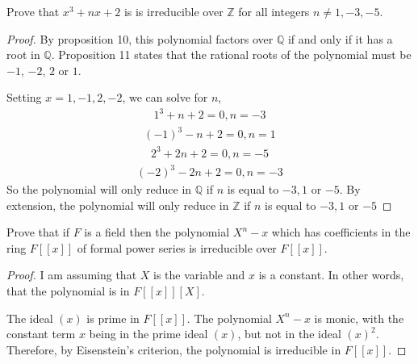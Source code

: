 \documentclass[10pt]{article}
\newenvironment{problem}[2][Problem]{\begin{trivlist}
		\item[\hskip \labelsep {\bfseries #1}\hskip \labelsep {\bfseries #2.}]}{\end{trivlist}}
\begin{document}
	\begin{problem}{4.13}
		Prove that $x^3+nx+2$ is is irreducible over $\mathbb{Z}$ for all integers $n \not = 1,-3,-5$.
		\begin{proof}
			By proposition 10, this polynomial factors over $\mathbb{Q}$ if and only if it has a root in $\mathbb{Q}$. Proposition 11 states that the rational roots of the polynomial must be $-1$, $-2$, $2$ or $1$.
			
			Setting $x=1,-1,2,-2$, we can solve for $n$, 
			\begin{align*}
				1^3 + n + 2 = 0, n = -3
			\end{align*}
			\begin{align*}
				(-1)^3 - n + 2 = 0, n = 1
			\end{align*}
			\begin{align*}
				2^3 + 2n + 2 = 0, n = -5
			\end{align*}
			\begin{align*}
				(-2)^3 - 2n + 2 = 0, n = -3
			\end{align*}
			So the polynomial will only reduce in $\mathbb{Q}$ if $n$ is equal to $-3,1$ or $-5$. By extension, the polynomial will only reduce in $\mathbb{Z}$ if $n$ is equal to $-3,1$ or $-5$
		\end{proof}
	\end{problem}
	
	\begin{problem}{4.15}
		Prove that if $F$ is a field then the polynomial $X^n - x$ which has coefficients in the ring $F[[x]]$ of formal power series is irreducible over $F[[x]]$.
		\begin{proof}
			I am assuming that $X$ is the variable and $x$ is a constant. In other words, that the polynomial is in $F[[x]][X]$.
			
			The ideal $(x)$ is prime in $F[[x]]$. The polynomial $X^n - x$ is monic, with the constant term $x$ being in the prime ideal $(x)$, but not in the ideal $(x)^2$. Therefore, by Eisenstein's criterion, the polynomial is irreducible in $F[[x]]$.
		\end{proof}
	\end{problem}
	
\end{document}
